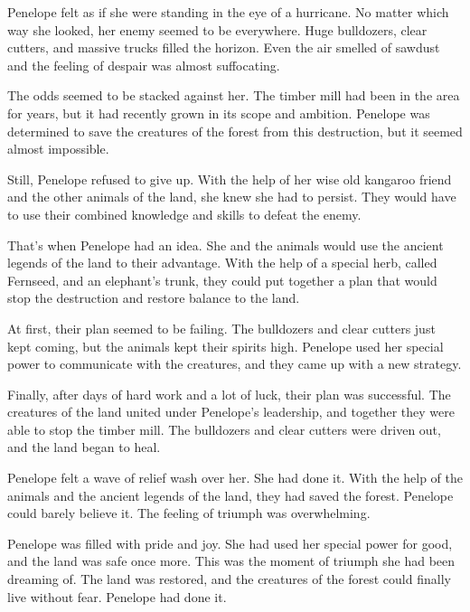 

Penelope felt as if she were standing in the eye of a hurricane. No matter which way she looked, her enemy seemed to be everywhere. Huge bulldozers, clear cutters, and massive trucks filled the horizon. Even the air smelled of sawdust and the feeling of despair was almost suffocating.

The odds seemed to be stacked against her. The timber mill had been in the area for years, but it had recently grown in its scope and ambition. Penelope was determined to save the creatures of the forest from this destruction, but it seemed almost impossible.

Still, Penelope refused to give up. With the help of her wise old kangaroo friend and the other animals of the land, she knew she had to persist. They would have to use their combined knowledge and skills to defeat the enemy.

That’s when Penelope had an idea. She and the animals would use the ancient legends of the land to their advantage. With the help of a special herb, called Fernseed, and an elephant’s trunk, they could put together a plan that would stop the destruction and restore balance to the land.

At first, their plan seemed to be failing. The bulldozers and clear cutters just kept coming, but the animals kept their spirits high. Penelope used her special power to communicate with the creatures, and they came up with a new strategy.

Finally, after days of hard work and a lot of luck, their plan was successful. The creatures of the land united under Penelope’s leadership, and together they were able to stop the timber mill. The bulldozers and clear cutters were driven out, and the land began to heal.

Penelope felt a wave of relief wash over her. She had done it. With the help of the animals and the ancient legends of the land, they had saved the forest. Penelope could barely believe it. The feeling of triumph was overwhelming.

Penelope was filled with pride and joy. She had used her special power for good, and the land was safe once more. This was the moment of triumph she had been dreaming of. The land was restored, and the creatures of the forest could finally live without fear. Penelope had done it.